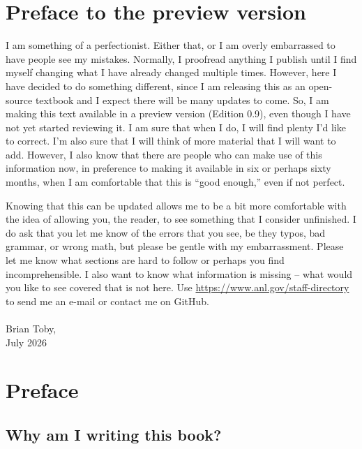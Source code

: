 \chapter{Preface to the preview version}
I am something of a perfectionist. Either that, or I am overly embarrassed to have people see my mistakes. 
Normally, I proofread anything I publish until I find myself changing what I have already changed multiple times. 
However, here I have decided to do something different, since I am releasing this as an open-source textbook and I expect there will be many updates to come. 
So, I am making this text available in a preview version (Edition 0.9), even though I have not yet started reviewing it. 
I am sure that when I do, I will find plenty I'd like to correct. 
I'm also sure that I will think of more material that I will want to add.
However, I also know that there are people who can make use of this information now, in preference to making it available in six or perhaps sixty months, when I am comfortable that this is ``good enough,'' even if not perfect.

Knowing that this can be updated allows me to be a bit more comfortable with the idea of allowing you, the reader, to see something that I consider unfinished. I do ask that you let me know of the errors that you see, be they typos, bad grammar, or wrong math, but please be gentle with my embarrassment. 
Please let me know what sections are hard to follow or perhaps you find incomprehensible. I also want to know what information is missing -- what would you like to see covered that is not here. Use \url{https://www.anl.gov/staff-directory} to send me an e-mail or contact me on GitHub. \\
\\
Brian Toby,\\
July 2026

\chapter{Preface}

\section*{Why am I writing this book?}

